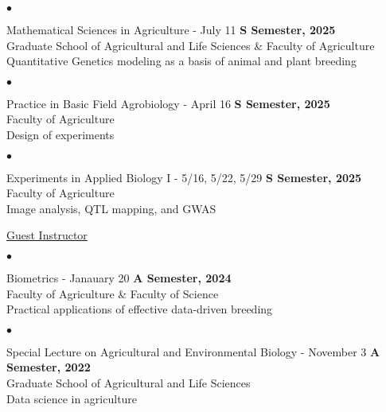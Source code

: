 \documentclass[margin,line,10pt]{res}
\newenvironment{list2}{
  \begin{list}{$\bullet$}{%
      \setlength{\itemsep}{0in}
      \setlength{\parsep}{0in} \setlength{\parskip}{0in}
      \setlength{\topsep}{0in} \setlength{\partopsep}{0in} 
      \setlength{\leftmargin}{0.2in}}}{\end{list}}
\begin{document}
\begin{resume}
 \vspace{0.4cm}


\begin{list2}
  \item Mathematical Sciences in Agriculture - July 11 \hfill {\bf S Semester, 2025} \\ %
  Graduate School of Agricultural and Life Sciences \& Faculty of Agriculture \\ %
  Quantitative Genetics modeling as a basis of animal and plant breeding %
\end{list2}

\vspace{0.4cm}

\begin{list2}
  \item Practice in Basic Field Agrobiology - April 16 \hfill {\bf S Semester, 2025} \\ %
  Faculty of Agriculture \\ %
  Design of experiments %
\end{list2}

\vspace{0.4cm}

\begin{list2}
  \item Experiments in Applied Biology I - 5/16, 5/22, 5/29 \hfill {\bf S Semester, 2025} \\ %
  Faculty of Agriculture \\ %
  Image analysis, QTL mapping, and GWAS
\end{list2}



\vspace{0.4cm}
\underline{Guest Instructor}
\vspace{0.4cm}
 \begin{list2}
 \item Biometrics - Janauary 20 \hfill {\bf A Semester, 2024} \\
 Faculty of Agriculture \& Faculty of Science \\ %
 Practical applications of effective data-driven breeding %
\end{list2}


\vspace{0.4cm}
 \begin{list2}
 \item Special Lecture on Agricultural and Environmental Biology - November 3  \hfill {\bf A Semester, 2022} \\
 Graduate School of Agricultural and Life Sciences \\ 
   Data science in agriculture
\end{list2}



\end{resume}
\end{document}
